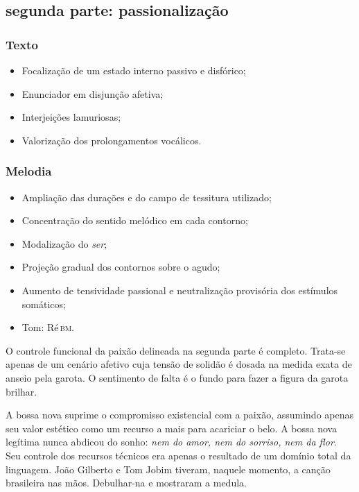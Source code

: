 \subsection{segunda parte: passionalização}


\subsubsection{Texto}
\begin{itemize}
\item Focalização de um estado interno passivo e disfórico;
\item Enunciador em disjunção afetiva;
\item Interjeições lamuriosas;
\item Valorização dos prolongamentos vocálicos.
\end{itemize}

\subsubsection{Melodia}
\begin{itemize}
\item Ampliação das durações e do campo de tessitura utilizado;
\item Concentração do sentido melódico em cada contorno;
\item Modalização do \textit{ser};
\item Projeção gradual dos contornos sobre o agudo;
\item Aumento de tensividade passional e neutralização provisória dos estímulos somáticos;
\item Tom: Ré\,\textsc{bm}.
\end{itemize}

O controle funcional da paixão delineada na segunda parte é completo.
Trata-se apenas de um cenário afetivo cuja tensão de solidão é dosada na
medida exata de anseio pela garota. O sentimento de falta é o fundo para
fazer a figura da garota brilhar.

A bossa nova suprime o compromisso existencial com a paixão, assumindo
apenas seu valor estético como um recurso a mais para acariciar o belo.
A bossa nova legítima nunca abdicou do sonho: \textit{nem do amor, nem do
sorriso, nem da flor}. Seu controle dos recursos técnicos era apenas o
resultado de um domínio total da linguagem. João Gilberto e Tom Jobim
tiveram, naquele momento, a canção brasileira nas mãos. Debulhar-na e
mostraram a medula.

